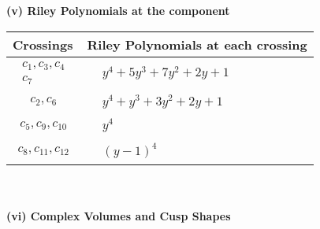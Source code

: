 \documentclass[1p]{elsarticle_modified}
\theoremstyle{definition}
\begin{document}
\newpage\renewcommand{\arraystretch}{1}
\flushleft \textbf{(v) Riley Polynomials at the component}\newline \\
\begin{tabular}{m{50pt}|m{274pt}}
Crossings & \hspace{64pt}Riley Polynomials at each crossing \\
\hline $$\begin{aligned}c_{1},c_{3},c_{4}\\c_{7}\end{aligned}$$&$\begin{aligned}
&y^4+5 y^3+7 y^2+2 y+1
\end{aligned}$\\
\hline $$\begin{aligned}c_{2},c_{6}\end{aligned}$$&$\begin{aligned}
&y^4+y^3+3 y^2+2 y+1
\end{aligned}$\\
\hline $$\begin{aligned}c_{5},c_{9},c_{10}\end{aligned}$$&$\begin{aligned}
&y^4
\end{aligned}$\\
\hline $$\begin{aligned}c_{8},c_{11},c_{12}\end{aligned}$$&$\begin{aligned}
&(y-1)^4
\end{aligned}$\\
\hline
\end{tabular}\\~\\
\newpage\flushleft \textbf{(vi) Complex Volumes and Cusp Shapes}
\end{document}
